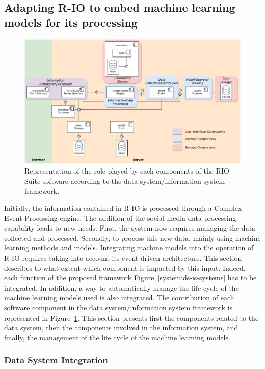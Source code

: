 \subsection{Adapting R-IO to embed machine learning models for its processing}
\begin{figure}[htb]
    \centering
    \includegraphics[width=\textwidth]{figures/chap-5/RIO-archi-concepts.pdf}
    \caption{Representation of the role played by each components of the RIO Suite software according to the data system/information system framework.}
    \label{system:rio-archi-contribution}
\end{figure}

Initially, the information contained in R-IO is processed through a Complex Event Processing engine.
The addition of the social media data processing capability leads to new needs.
First, the system now requires managing the data collected and processed.
Secondly, to process this new data, mainly using machine learning methods and models.
Integrating machine models into the operation of R-IO requires taking into account its event-driven architecture.
This section describes to what extent which component is impacted by this input.
Indeed, each function of the proposed framework Figure~\ref{system:ds-is-systems} has to be integrated.
In addition, a way to automatically manage the life cycle of the machine learning models used is also integrated.
The contribution of each software component in the data system/information system framework is represented in Figure~\ref{system:rio-archi-contribution}.
This section presents first the components related to the data system, then the components involved in the information system, and finally, the management of the life cycle of the machine learning models.

\subsubsection{Data System Integration}
